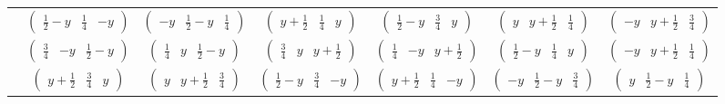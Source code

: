 \documentclass[fleqn,9pt,landscape]{jsarticle}
\begin{document}
\begin{center}
\begin{longtable}{ccccccc}
& $ \begin{pmatrix} \frac{1}{2} - y & \frac{1}{4} & - y \end{pmatrix} $ & $ \begin{pmatrix} - y & \frac{1}{2} - y & \frac{1}{4} \end{pmatrix} $ & $ \begin{pmatrix} y + \frac{1}{2} & \frac{1}{4} & y \end{pmatrix} $ & $ \begin{pmatrix} \frac{1}{2} - y & \frac{3}{4} & y \end{pmatrix} $ & $ \begin{pmatrix} y & y + \frac{1}{2} & \frac{1}{4} \end{pmatrix} $ & $ \begin{pmatrix} - y & y + \frac{1}{2} & \frac{3}{4} \end{pmatrix} $ \\
& $ \begin{pmatrix} \frac{3}{4} & - y & \frac{1}{2} - y \end{pmatrix} $ & $ \begin{pmatrix} \frac{1}{4} & y & \frac{1}{2} - y \end{pmatrix} $ & $ \begin{pmatrix} \frac{3}{4} & y & y + \frac{1}{2} \end{pmatrix} $ & $ \begin{pmatrix} \frac{1}{4} & - y & y + \frac{1}{2} \end{pmatrix} $ & $ \begin{pmatrix} \frac{1}{2} - y & \frac{1}{4} & y \end{pmatrix} $ & $ \begin{pmatrix} - y & y + \frac{1}{2} & \frac{1}{4} \end{pmatrix} $ \\
& $ \begin{pmatrix} y + \frac{1}{2} & \frac{3}{4} & y \end{pmatrix} $ & $ \begin{pmatrix} y & y + \frac{1}{2} & \frac{3}{4} \end{pmatrix} $ & $ \begin{pmatrix} \frac{1}{2} - y & \frac{3}{4} & - y \end{pmatrix} $ & $ \begin{pmatrix} y + \frac{1}{2} & \frac{1}{4} & - y \end{pmatrix} $ & $ \begin{pmatrix} - y & \frac{1}{2} - y & \frac{3}{4} \end{pmatrix} $ & $ \begin{pmatrix} y & \frac{1}{2} - y & \frac{1}{4} \end{pmatrix} $ \\ \hline

\end{longtable}
\end{center}
\end{document}
